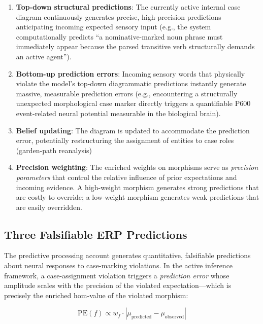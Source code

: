 \documentclass[
]{article}
\begin{document}
\begin{enumerate}
\def\labelenumi{\arabic{enumi}.}
\item
  \textbf{Top-down structural predictions}: The currently active
  internal case diagram continuously generates precise, high-precision
  predictions anticipating incoming expected sensory input (e.g., the
  system computationally predicts ``a nominative-marked noun phrase must
  immediately appear because the parsed transitive verb structurally
  demands an active agent'').
\item
  \textbf{Bottom-up prediction errors}: Incoming sensory words that
  physically violate the model's top-down diagrammatic predictions
  instantly generate massive, measurable prediction errors (e.g.,
  encountering a structurally unexpected morphological case marker
  directly triggers a quantifiable P600 event-related neural potential
  measurable in the biological brain).
\item
  \textbf{Belief updating}: The diagram is updated to accommodate the
  prediction error, potentially restructuring the assignment of entities
  to case roles (garden-path reanalysis)
\item
  \textbf{Precision weighting}: The enriched weights on morphisms serve
  as \emph{precision parameters} that control the relative influence of
  prior expectations and incoming evidence. A high-weight morphism
  generates strong predictions that are costly to override; a low-weight
  morphism generates weak predictions that are easily overridden.
\end{enumerate}

\subsection{Three Falsifiable ERP
Predictions}\label{three-falsifiable-erp-predictions}

The predictive processing account generates quantitative, falsifiable
predictions about neural responses to case-marking violations. In the
active inference framework, a case-assignment violation triggers a
\emph{prediction error} whose amplitude scales with the precision of the
violated expectation---which is precisely the enriched hom-value of the
violated morphism:

\begin{equation}
\text{PE}(f) \propto w_f \cdot |\mu_{\text{predicted}} - \mu_{\text{observed}}|
\label{eq:pe-precision-error}
\end{equation}
\end{document}
